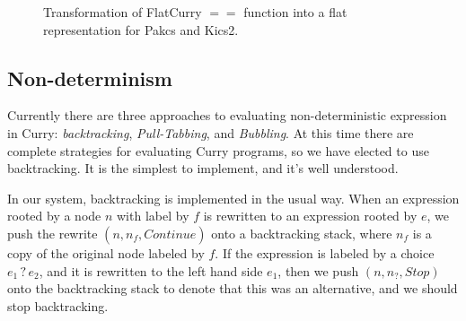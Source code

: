 \documentclass{book}
\theoremstyle{definition}
\newcommand{\Conid}[1]{\mathit{#1}}
\newcommand{\Varid}[1]{\mathit{#1}}
\def\resethooks{%
  \global\let\SaveRestoreHook\empty
  \global\let\ColumnHook\empty}
\newcommand{\hsindent}[1]{\quad}%
\begin{document}
\begin{figure}
\resethooks

\caption{Transformation of FlatCurry \ensuremath{\Varid{==}} function into a flat representation
         for Pakcs and Kics2.}
\label{fig:eqList}
\end{figure}

\subsection{Non-determinism} \label{Non-determinism}


Currently there are three approaches to evaluating non-deterministic expression in Curry:
\emph{backtracking}, 
\emph{Pull-Tabbing}\cite{pulltab}, and 
\emph{Bubbling}\cite{bubbling}.
At this time there are complete strategies for evaluating Curry programs,
so we have elected to use backtracking.
It is the simplest to implement, and it's well understood.

In our system, backtracking is implemented in the usual way.
When an expression rooted by a node \ensuremath{\Varid{n}} with label by \ensuremath{\Varid{f}} 
is rewritten to an expression rooted by \ensuremath{\Varid{e}},
we push the rewrite \ensuremath{(\Varid{n},\Varid{n}_{\Varid{f}},\Conid{Continue})} onto a backtracking stack, where \ensuremath{\Varid{n}_{\Varid{f}}}
is a copy of the original node labeled by \ensuremath{\Varid{f}}.
If the expression is labeled by a choice \ensuremath{\Varid{e}_{\mathrm{1}}\mathbin{?}\Varid{e}_{\mathrm{2}}}, and it is rewritten to the left hand side \ensuremath{\Varid{e}_{\mathrm{1}}},
then we push \ensuremath{(\Varid{n},\Varid{n}_?,\Conid{Stop})} onto the backtracking stack to denote that this 
was an alternative, and we should stop backtracking.
\end{document}
